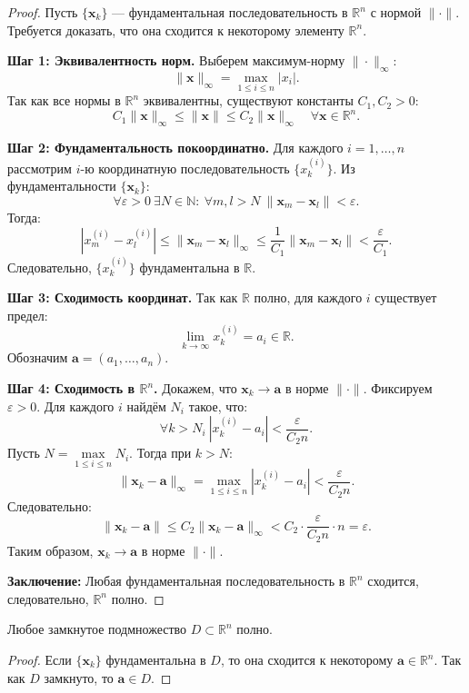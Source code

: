 \begin{proof}
Пусть $\{\mathbf{x}_k\}$ — фундаментальная последовательность в $\mathbb{R}^n$ с нормой $\|\cdot\|$. Требуется доказать, что она сходится к некоторому элементу $\mathbb{R}^n$.

\medskip
\textbf{Шаг 1: Эквивалентность норм.} 
Выберем максимум-норму $\|\cdot\|_\infty$:
\[
\|\mathbf{x}\|_\infty = \max_{1 \leq i \leq n} |x_i|.
\]
Так как все нормы в $\mathbb{R}^n$ эквивалентны, существуют константы $C_1, C_2 > 0$:
\[
C_1 \|\mathbf{x}\|_\infty \leq \|\mathbf{x}\| \leq C_2 \|\mathbf{x}\|_\infty \quad \forall \mathbf{x} \in \mathbb{R}^n.
\]

\medskip
\textbf{Шаг 2: Фундаментальность покоординатно.} 
Для каждого $i = 1,\dots,n$ рассмотрим $i$-ю координатную последовательность $\{x_k^{(i)}\}$. Из фундаментальности $\{\mathbf{x}_k\}$:
\[
\forall \varepsilon > 0  \ \exists N \in \mathbb{N}: \ \forall m,l > N \ \|\mathbf{x}_m - \mathbf{x}_l\| < \varepsilon.
\]
Тогда:
\[
|x_m^{(i)} - x_l^{(i)}| \leq \|\mathbf{x}_m - \mathbf{x}_l\|_\infty \leq \frac{1}{C_1} \|\mathbf{x}_m - \mathbf{x}_l\| < \frac{\varepsilon}{C_1}.
\]
Следовательно, $\{x_k^{(i)}\}$ фундаментальна в $\mathbb{R}$.

\medskip
\textbf{Шаг 3: Сходимость координат.} 
Так как $\mathbb{R}$ полно, для каждого $i$ существует предел:
\[
\lim_{k \to \infty} x_k^{(i)} = a_i \in \mathbb{R}.
\]
Обозначим $\mathbf{a} = (a_1, \dots, a_n)$.

\medskip
\textbf{Шаг 4: Сходимость в $\mathbb{R}^n$.} 
Докажем, что $\mathbf{x}_k \to \mathbf{a}$ в норме $\|\cdot\|$. Фиксируем $\varepsilon > 0$. Для каждого $i$ найдём $N_i$ такое, что:
\[
\forall k > N_i \ |x_k^{(i)} - a_i| < \frac{\varepsilon}{C_2 n}.
\]
Пусть $N = \max\limits_{1 \leq i \leq n} N_i$. Тогда при $k > N$:
\[
\|\mathbf{x}_k - \mathbf{a}\|_\infty = \max_{1 \leq i \leq n} |x_k^{(i)} - a_i| < \frac{\varepsilon}{C_2 n}.
\]
Следовательно:
\[
\|\mathbf{x}_k - \mathbf{a}\| \leq C_2 \|\mathbf{x}_k - \mathbf{a}\|_\infty < C_2 \cdot \frac{\varepsilon}{C_2 n} \cdot n = \varepsilon.
\]
Таким образом, $\mathbf{x}_k \to \mathbf{a}$ в норме $\|\cdot\|$.

\medskip
\textbf{Заключение:} Любая фундаментальная последовательность в $\mathbb{R}^n$ сходится, следовательно, $\mathbb{R}^n$ полно.
\end{proof}

\begin{theorem}[Следствие]
Любое замкнутое подмножество $D \subset \mathbb{R}^n$ полно.
\end{theorem}
\begin{proof}
Если $\{\mathbf{x}_k\}$ фундаментальна в $D$, то она сходится к некоторому $\mathbf{a} \in \mathbb{R}^n$. Так как $D$ замкнуто, то $\mathbf{a} \in D$.
\end{proof}



